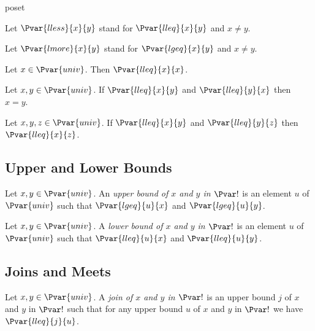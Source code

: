 \documentclass{stex}
\begin{document}
\begin{smodule}{poset}
\begin{forthel}
    Let $\Pvar{lless}{x}{y}$ stand for $\Pvar{lleq}{x}{y}$ and $x\neq y$.

    Let $\Pvar{lmore}{x}{y}$ stand for $\Pvar{lgeq}{x}{y}$ and $x\neq y$.

    \begin{axiom}[Reflexivity]
      Let $x\in\Pvar{univ}$.
      Then $\Pvar{lleq}{x}{x}$.
    \end{axiom}

    \begin{axiom}[Antisymmetry]
      Let $x,y\in\Pvar{univ}$.
      If $\Pvar{lleq}{x}{y}$ and $\Pvar{lleq}{y}{x}$ then $x=y$.
    \end{axiom}

    \begin{axiom}[Transitivity]
      Let $x,y,z\in\Pvar{univ}$.
      If $\Pvar{lleq}{x}{y}$ and $\Pvar{lleq}{y}{z}$ then $\Pvar{lleq}{x}{z}$.
    \end{axiom}
  \end{forthel}

  \subsection{Upper and Lower Bounds}

  \begin{forthel}
    \begin{definition}
      Let $x,y\in\Pvar{univ}$.
      An \emph{upper bound of $x$ and $y$ in $\Pvar!$} is an element $u$ of $\Pvar{univ}$ such that $\Pvar{lgeq}{u}{x}$ and $\Pvar{lgeq}{u}{y}$.
    \end{definition}
    
    \begin{definition}
      Let $x,y\in\Pvar{univ}$.
      A \emph{lower bound of $x$ and $y$ in $\Pvar!$} is an element $u$ of $\Pvar{univ}$ such that $\Pvar{lleq}{u}{x}$ and $\Pvar{lleq}{u}{y}$.
    \end{definition}
  \end{forthel}

  \subsection{Joins and Meets}

  \begin{forthel}
    \begin{definition}
      Let $x,y\in\Pvar{univ}$.
      A \emph{join of $x$ and $y$ in $\Pvar!$} is an upper bound $j$ of $x$ and $y$ in $\Pvar!$ such that for any upper bound $u$ of $x$ and $y$ in $\Pvar!$ we have $\Pvar{lleq}{j}{u}$.
    \end{definition}


\end{forthel}
\end{smodule}
\end{document}
